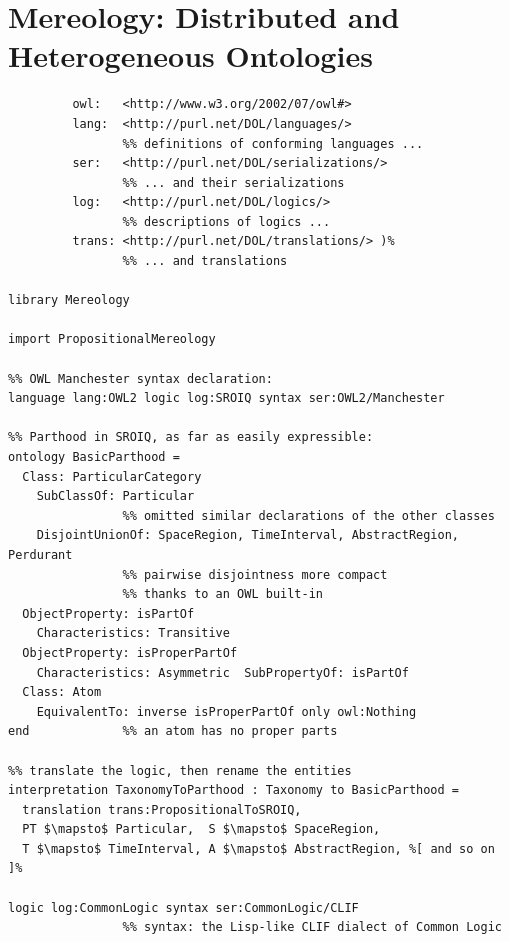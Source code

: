 \documentclass[10pt,fleqn,final]{scrreprt}
\newcommand{\sclause}[1]{\section{#1}}
\begin{document}
\sclause{Mereology: Distributed and Heterogeneous Ontologies}
\label{dist-het-onto}
\begin{lstlisting}[basicstyle=\ttfamily,language=dolText,alsolanguage=owl2Manchester,alsolanguage=clif,escapechar=@,mathescape]
%prefix( :      <http://www.example.org/mereology#>
         owl:   <http://www.w3.org/2002/07/owl#>
         lang:  <http://purl.net/DOL/languages/>
                %% definitions of conforming languages ...
         ser:   <http://purl.net/DOL/serializations/>
                %% ... and their serializations
         log:   <http://purl.net/DOL/logics/>
                %% descriptions of logics ...
         trans: <http://purl.net/DOL/translations/> )%
                %% ... and translations

library Mereology

import PropositionalMereology

%% OWL Manchester syntax declaration: 
language lang:OWL2 logic log:SROIQ syntax ser:OWL2/Manchester           

%% Parthood in SROIQ, as far as easily expressible:
ontology BasicParthood =                             
  Class: ParticularCategory 
  	SubClassOf: Particular
                %% omitted similar declarations of the other classes
    DisjointUnionOf: SpaceRegion, TimeInterval, AbstractRegion, Perdurant
                %% pairwise disjointness more compact 
                %% thanks to an OWL built-in
  ObjectProperty: isPartOf        
  	Characteristics: Transitive
  ObjectProperty: isProperPartOf  
  	Characteristics: Asymmetric  SubPropertyOf: isPartOf 
  Class: Atom 
  	EquivalentTo: inverse isProperPartOf only owl:Nothing
end             %% an atom has no proper parts

%% translate the logic, then rename the entities
interpretation TaxonomyToParthood : Taxonomy to BasicParthood =
  translation trans:PropositionalToSROIQ,
  PT $\mapsto$ Particular,	S $\mapsto$ SpaceRegion, 
  T $\mapsto$ TimeInterval,	A $\mapsto$ AbstractRegion, %[ and so on ]%

logic log:CommonLogic syntax ser:CommonLogic/CLIF
                %% syntax: the Lisp-like CLIF dialect of Common Logic


\end{lstlisting}
\end{document}
